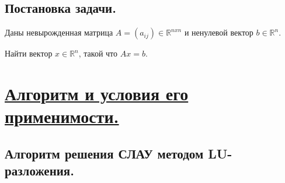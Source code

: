 \documentclass[a4paper, 12pt]{article}
\begin{document}
	\subsection{Постановка задачи.}
	
	Даны невырожденная матрица $A=(a_{ij})\in \mathbb{R}^{nxn}$ и ненулевой вектор $b\in \mathbb{R}^n$.
	
	Найти вектор $x\in \mathbb{R}^n$, такой что $Ax=b$.
	
	\section{\underline{Алгоритм и условия его применимости.}}
	
	\subsection{Алгоритм решения СЛАУ методом LU-разложения.}
	
\end{document}
